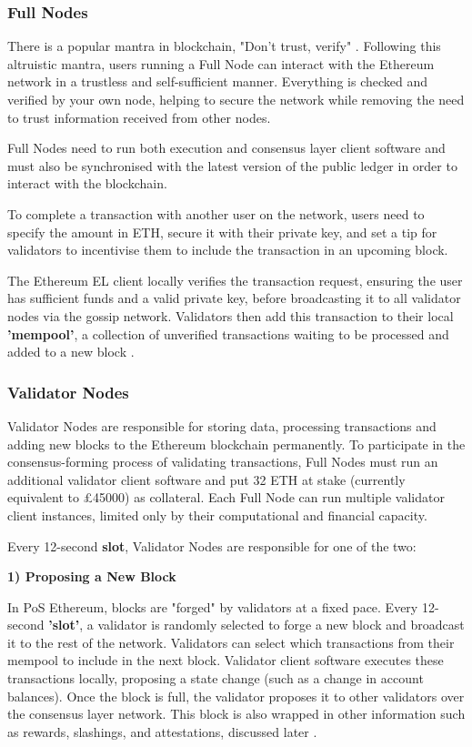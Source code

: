 \subsubsection{Full Nodes}
There is a popular mantra in blockchain, "Don't trust, verify" \cite{EthereumEthereum.org}. Following this altruistic mantra, users running a Full Node can interact with the Ethereum network in a trustless and self-sufficient manner. Everything is checked and verified by your own node, helping to secure the network while removing the need to trust information received from other nodes. 

Full Nodes need to run both execution and consensus layer client software and must also be synchronised with the latest version of the public ledger in order to interact with the blockchain. 

To complete a transaction with another user on the network, users need to specify the amount in ETH, secure it with their private key, and set a tip for validators to incentivise them to include the transaction in an upcoming block.

The Ethereum EL client locally verifies the transaction request, ensuring the user has sufficient funds and a valid private key, before broadcasting it to all validator nodes via the gossip network. Validators then add this transaction to their local \textbf{'mempool'}, a collection of unverified transactions waiting to be processed and added to a new block \cite{EthereumEthereum.org}.

\subsubsection{Validator Nodes}
\label{ValidatorsLitRev}
Validator Nodes are responsible for storing data, processing transactions and adding new blocks to the Ethereum blockchain permanently. To participate in the consensus-forming process of validating transactions, Full Nodes must run an additional validator client software and put 32 ETH at stake (currently equivalent to £45000) as collateral. Each Full Node can run multiple validator client instances, limited only by their computational and financial capacity.

Every 12-second \textbf{slot}, Validator Nodes are responsible for one of the two:

\textbf{1) Proposing a New Block}

In PoS Ethereum, blocks are "forged" by validators at a fixed pace. Every 12-second \textbf{'slot'}, a validator is randomly selected to forge a new block and broadcast it to the rest of the network. Validators can select which transactions from their mempool to include in the next block. Validator client software executes these transactions locally, proposing a state change (such as a change in account balances). Once the block is full, the validator proposes it to other validators over the consensus layer network. This block is also wrapped in other information such as rewards, slashings, and attestations, discussed later \cite{EthereumEthereum.org}.

